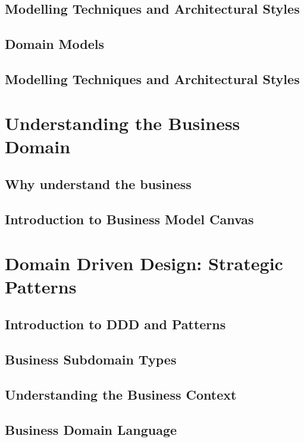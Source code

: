 \documentclass[a4paper, 11pt]{book}
\begin{document}
    \section{Modelling Techniques and Architectural Styles}


    \section{Domain Models}


    \section{Modelling Techniques and Architectural Styles}


    \chapter{Understanding the Business Domain}


    \section{Why understand the business}


    \section{Introduction to Business Model Canvas}


    \chapter{Domain Driven Design: Strategic Patterns}


    \section{Introduction to DDD and Patterns}


    \section{Business Subdomain Types}


    \section{Understanding the Business Context}


    \section{Business Domain Language}
\end{document}
